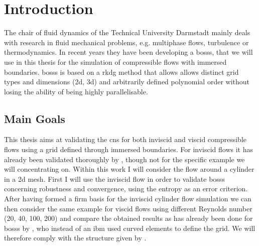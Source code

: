 \chapter{Introduction}
The chair of fluid dynamics of the Technical University Darmstadt mainly deals with research in fluid mechanical problems, e.g. multiphase flows, turbulence or thermodynamics. In recent years they have been developing a \gls{bosss}, that we will use in this thesis for the simulation of compressible flows with immersed boundaries. \gls{bosss} is based on a \gls{rkdg} method that allows allows distinct grid types and dimensions (\gls{2d}, \gls{3d}) and arbitrarily defined polynomial order without losing the ability of being highly parallelisable. 

\section{Main Goals}

This thesis aims at validating the \gls{cns} for both inviscid and viscid compressible flows using a grid defined through immersed boundaries. For inviscid flows it has already been validated thoroughly by \cite{mueller2014}, though not for the specific example we will concentrating on. 
Within this work I will consider the flow around a cylinder in a \gls{2d} mesh. First I will use the inviscid flow in order to validate \gls{bosss} concerning robustness and convergence, using the entropy as an error criterion. \\ \indent
After having formed a firm basis for the inviscid cylinder flow simulation we can then consider the same example for viscid flows using different Reynolds number (20, 40, 100, 200) and compare the obtained results as has already been done for \gls{bosss} by \cite{ayers}, who instead of an \gls{ibm} used curved elements to define the grid. We will therefore comply with the structure given by \cite{ayers}.


